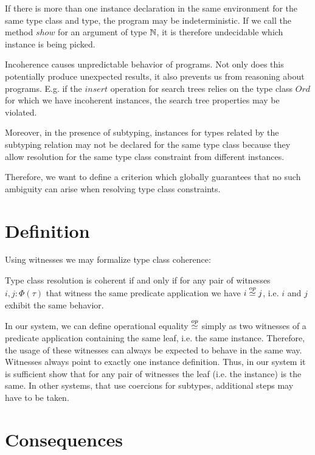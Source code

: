 If there is more than one instance declaration in the same environment for the same type class and type,
the program may be indeterministic.
If we call the method $\mathit{show}$ for an argument of type $\mathbb{N}$,
it is therefore undecidable which instance is being picked.

Incoherence causes unpredictable behavior of programs.
Not only does this potentially produce unexpected results, it also prevents us from reasoning about programs.
E.g. if the $\mathit{insert}$ operation for search trees relies on the type class $\mathit{Ord}$ for which we have incoherent instances,
the search tree properties may be violated. \cite{Kilpatrick2019-cy}

Moreover, in the presence of subtyping, instances for types related by the subtyping relation may not be declared for the same type class because they allow resolution for the same type class constraint from different instances.

Therefore, we want to define a criterion which globally guarantees that no such ambiguity can arise when resolving type class constraints.


\section{Definition}

Using witnesses we may formalize type class coherence:

\begin{definition}
  Type class resolution is coherent if and only if for any pair of witnesses $i,j : \Phi(\tau)$ that witness the same predicate application we have $i \stackrel{op}{\simeq} j$, i.e. $i$ and $j$ exhibit the same behavior.
\end{definition}

In our  system, we can define operational equality $\stackrel{op}{\simeq}$ simply as two witnesses of a predicate application containing the same leaf, i.e. the same instance.
Therefore, the usage of these witnesses can always be expected to behave in the same way.
Witnesses always point to exactly one instance definition.
Thus, in our system it is sufficient show that for any pair of witnesses the leaf (i.e. the instance) is the same.
In other systems, that use coercions for subtypes, additional steps may have to be taken.

\section{Consequences}


